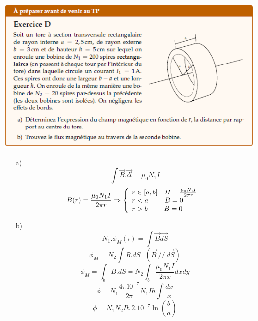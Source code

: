 \documentclass	[11pt, a4paper, openany]{book}
\begin{document}
\newpage
\begin{center}
\includegraphics[scale=1]{prepa/exoD.png}\\
\end{center}
\begin{itemize}
\item[a) ] 
$$\int \vec{B}.\vec{dl} = \mu_0 N_1I$$
$$B(r) = \frac{\mu_0 N_1I}{2\pi r}
\Rightarrow \left\{\begin{array}{l}
r \in [a,b] \ \ \  B = \frac{\mu_0 N_1I}{2\pi r}\\
r < a\ \ \ \ \ \ \ B = 0\\
r > b\ \ \ \ \ \ \ B = 0\end{array}\right.\\$$


\item[b) ]
$$N_1. \phi_M(t) = \int \vec{B}\vec{dS}$$
$$\phi_M = N_2 \int B.dS\ \ \ (\vec{B}\ //\ \vec{dS})$$
$$\phi_M = \int_b B.dS = N_2 \int_b \frac{\mu_0 N_1 I}{2\pi x} dxdy$$
$$\phi = N_1 \frac{4\pi 10^{-7}}{2\pi}N_1 I h \int \frac{dx}{x}$$
$$\phi = N_1 N_2 I h\ 2.10^{-7}\ln\left(\frac{b}{a}\right)$$
\end{itemize}



\tableofcontents
\end{document}
